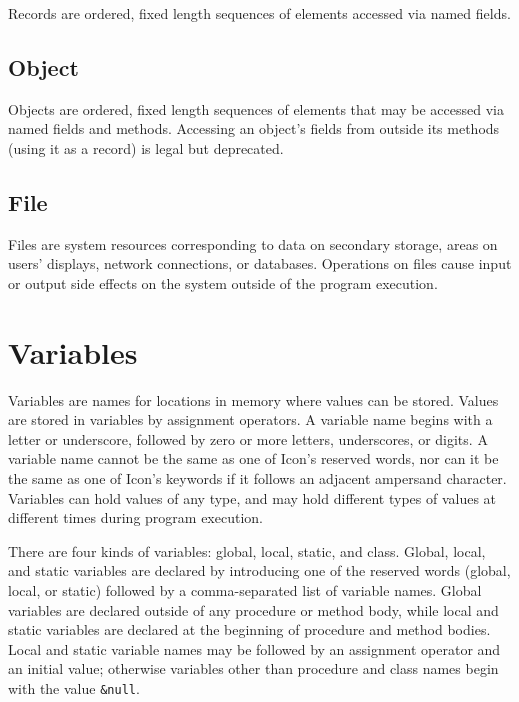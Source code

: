 Records are ordered, fixed length sequences of elements
accessed via named fields.

\subsection*{Object}

Objects are ordered, fixed length sequences of elements that may
be accessed via named fields and methods. Accessing an object's fields from
outside its methods (using it as a record) is legal but deprecated.

\subsection*{File}

Files are system resources corresponding to data on secondary
storage, areas on users' displays, network connections, or
databases. Operations on files cause input or output side
effects on the system outside of the program execution.

\section{Variables}

Variables are names for locations in memory where values can be stored.
Values are stored in variables by assignment
operators. A variable name begins with a letter or
underscore, followed by zero or more letters, underscores, or digits. A
variable name cannot be the same as one of Icon's
reserved words, nor can it be the same as one of
Icon's keywords if it follows an adjacent ampersand
character. Variables can hold values of any type, and may hold
different types of values at different times during program execution.

There are four kinds of variables: global,
local, static, and class. Global,
local, and static variables are declared by introducing one of the
reserved words (\textsf{global}, \textsf{local}, or \textsf{static})
followed by a comma-separated list of variable names. Global variables
are declared outside of any procedure or method body, while local and
static variables are declared at the beginning of procedure and method
bodies. Local and static variable names may be followed by
an assignment operator and an initial value; otherwise variables
other than procedure and class names begin with the value
\texttt{\&null}.

